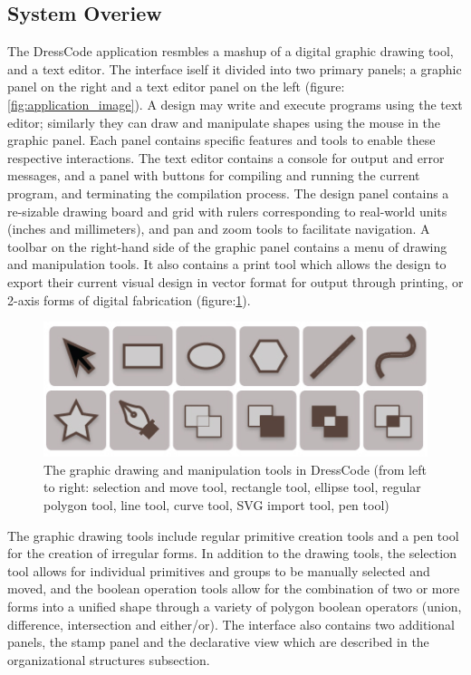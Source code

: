 \documentclass{sigchi}
\begin{document}
\subsection{System Overiew}
The DressCode application resmbles a mashup of a digital graphic drawing tool, and a text editor. The interface iself it divided into two primary panels; a graphic panel on the right and a text editor panel on the left (figure:\ref{fig:application_image}). A design may write and execute programs using the text editor; similarly they can draw and manipulate shapes using the mouse in the graphic panel. Each panel contains specific features and tools to enable these respective interactions. The text editor contains a console for output and error messages, and a panel with buttons for compiling and running the current program, and terminating the compilation process. The design panel contains a re-sizable drawing board and grid with rulers corresponding to real-world units (inches and millimeters), and pan and zoom tools to facilitate navigation. A toolbar on the right-hand side of the graphic panel contains a menu of drawing and manipulation tools. It also contains a print tool which allows the design to export their current visual design in vector format for output through printing, or 2-axis forms of digital fabrication (figure:\ref{fig:graphic_tools}).

\begin{center}
\begin{figure}[h!]
\includegraphics[width=\columnwidth]{images/graphic_tools.jpg}
\caption{The graphic drawing and manipulation tools in DressCode (from left to right: selection and move tool, rectangle tool, ellipse tool, regular polygon tool, line tool, curve tool, SVG import tool, pen tool)}
\label{fig:graphic_tools}
\end{figure}
\end{center}
\vspace{-20pt}

The graphic drawing tools include regular primitive creation tools and a pen tool for the creation of irregular forms.  In addition to the drawing tools, the selection tool allows for individual primitives and groups to be manually selected and moved, and the boolean operation tools allow for the combination of two or more forms into a unified shape through a variety of polygon boolean operators (union, difference, intersection and either/or). The interface also contains two additional panels, the stamp panel and the declarative view which are described in the organizational structures subsection.
\end{document}
